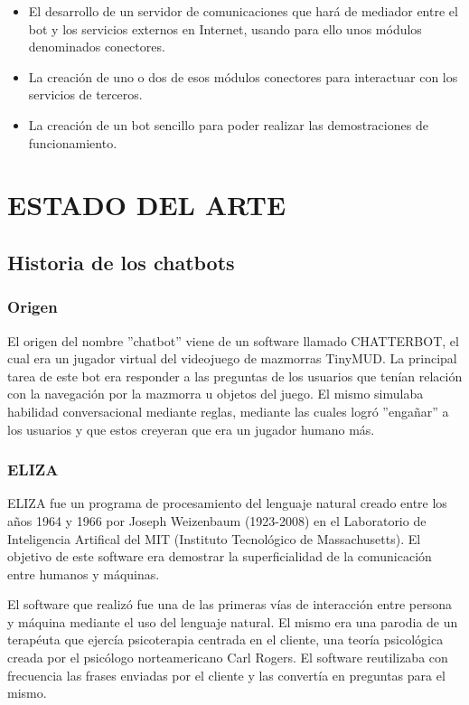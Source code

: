 \documentclass[spanish,12pt, a4paper, twoside]{paper}
\let\oldsection\section
\def\section{\cleardoublepage\oldsection}
\begin{document}
\begin{itemize}
\item El desarrollo de un servidor de comunicaciones que hará de mediador entre el bot y los servicios externos en Internet, usando para ello unos módulos denominados conectores.
\item La creación de uno o dos de esos módulos conectores para interactuar con los servicios de terceros.
\item La creación de un bot sencillo para poder realizar las demostraciones de funcionamiento.
\end{itemize}

\section{ESTADO DEL ARTE}

\subsection{Historia de los chatbots}

\subsubsection{Origen}

El origen del nombre ''chatbot'' viene de un software llamado CHATTERBOT, el cual era un jugador virtual del videojuego de mazmorras TinyMUD. La principal tarea de este bot era responder a las preguntas de los usuarios que tenían relación con la navegación por la mazmorra u objetos del juego. El mismo simulaba habilidad conversacional mediante reglas, mediante las cuales logró ''engañar'' a los usuarios y que estos creyeran que era un jugador humano más. \cite[pág. 2]{CANLI}

\subsubsection{ELIZA}
ELIZA fue un programa de procesamiento del lenguaje natural creado entre los años 1964 y 1966 por Joseph Weizenbaum (1923-2008) en el Laboratorio de Inteligencia Artifical del MIT (Instituto Tecnológico de Massachusetts). El objetivo de este software era demostrar la superficialidad de la comunicación entre humanos y máquinas.
\newline

El software que realizó fue una de las primeras vías de interacción entre persona y máquina mediante el uso del lenguaje natural. El mismo era una parodia de un terapéuta que ejercía psicoterapia centrada en el cliente, una teoría psicológica creada por el psicólogo norteamericano Carl Rogers. El software reutilizaba con frecuencia las frases enviadas por el cliente y las convertía en preguntas para el mismo.
\newline
\end{document}
